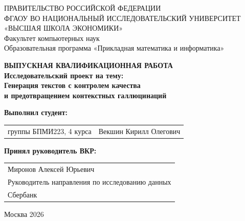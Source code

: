 \begin{titlepage}
\newpage

{
\begin{center}
ПРАВИТЕЛЬСТВО РОССИЙСКОЙ ФЕДЕРАЦИИ\\
ФГАОУ ВО НАЦИОНАЛЬНЫЙ ИССЛЕДОВАТЕЛЬСКИЙ УНИВЕРСИТЕТ\\
«ВЫСШАЯ ШКОЛА ЭКОНОМИКИ»
\\
\bigskip
Факультет компьютерных наук\\
Образовательная программа «Прикладная математика и информатика»
\end{center}
}

\vspace{7em}

\begin{center}
{\bf ВЫПУСКНАЯ КВАЛИФИКАЦИОННАЯ РАБОТА}\\
{\bf Исследовательский проект на тему:}\\[0.5em]
{\bf Генерация текстов с контролем качества\\
и предотвращением контекстных галлюцинаций}\\
\end{center}

\vspace{2em}

{\bf Выполнил студент:\vspace{2mm}}

{
\begin{tabular}{l@{\hskip 1.5cm}l}
группы БПМИ223, 4 курса & Векшин Кирилл Олегович
\end{tabular}}

\vspace{1em}
{\bf Принял руководитель ВКР:\vspace{2mm}}

{
\begin{tabular}{l}
{Миронов Алексей Юрьевич}\\
{Руководитель направления по исследованию данных}\\
Сбербанк
\end{tabular}}

\vspace{\fill}

\begin{center}
Москва 2026
\end{center}

\end{titlepage}
